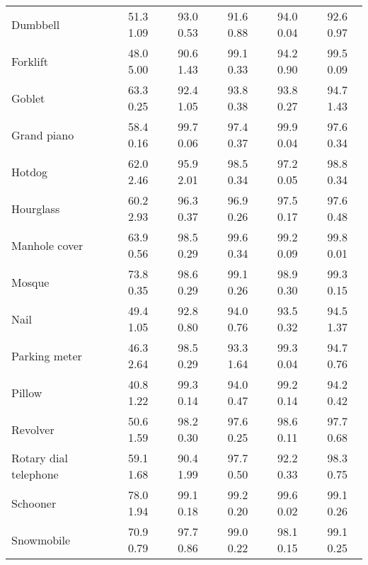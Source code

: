 \documentclass[10pt]{article} \usepackage[accepted]{stylefiles/tmlr}
\begin{document}
\begin{table*}[th]
\begin{tabular}{lccccc}
Dumbbell & \multicolumn{1}{c|}{51.3  1.09} & 93.0  0.53 & \multicolumn{1}{c|}{91.6  0.88} & 94.0  0.04 & \multicolumn{1}{c}{92.6  0.97} \\
Forklift & \multicolumn{1}{c|}{48.0  5.00} & 90.6  1.43 & \multicolumn{1}{c|}{99.1  0.33} & 94.2  0.90 & \multicolumn{1}{c}{99.5  0.09} \\
Goblet & \multicolumn{1}{c|}{63.3  0.25} & 92.4  1.05 & \multicolumn{1}{c|}{93.8  0.38} & 93.8  0.27 & \multicolumn{1}{c}{94.7  1.43} \\
Grand piano & \multicolumn{1}{c|}{58.4  0.16} & 99.7  0.06 & \multicolumn{1}{c|}{97.4  0.37} & 99.9  0.04 & \multicolumn{1}{c}{97.6  0.34} \\
Hotdog & \multicolumn{1}{c|}{62.0  2.46} & 95.9  2.01 & \multicolumn{1}{c|}{98.5  0.34} & 97.2  0.05 & \multicolumn{1}{c}{98.8  0.34} \\
Hourglass & \multicolumn{1}{c|}{60.2  2.93} & 96.3  0.37 & \multicolumn{1}{c|}{96.9  0.26} & 97.5  0.17 & \multicolumn{1}{c}{97.6  0.48} \\
Manhole cover & \multicolumn{1}{c|}{63.9  0.56} & 98.5  0.29 & \multicolumn{1}{c|}{99.6  0.34} & 99.2  0.09 & \multicolumn{1}{c}{99.8  0.01} \\
Mosque & \multicolumn{1}{c|}{73.8  0.35} & 98.6  0.29 & \multicolumn{1}{c|}{99.1  0.26} & 98.9  0.30 & \multicolumn{1}{c}{99.3  0.15} \\
Nail & \multicolumn{1}{c|}{49.4  1.05} & 92.8  0.80 & \multicolumn{1}{c|}{94.0  0.76} & 93.5  0.32 & \multicolumn{1}{c}{94.5  1.37} \\
Parking meter & \multicolumn{1}{c|}{46.3  2.64} & 98.5  0.29 & \multicolumn{1}{c|}{93.3  1.64} & 99.3  0.04 & \multicolumn{1}{c}{94.7  0.76} \\
Pillow & \multicolumn{1}{c|}{40.8  1.22} & 99.3  0.14 & \multicolumn{1}{c|}{94.0  0.47} & 99.2  0.14 & \multicolumn{1}{c}{94.2  0.42} \\
Revolver & \multicolumn{1}{c|}{50.6  1.59} & 98.2  0.30 & \multicolumn{1}{c|}{97.6  0.25} & 98.6  0.11 & \multicolumn{1}{c}{97.7  0.68} \\
Rotary dial telephone & \multicolumn{1}{c|}{59.1  1.68} & 90.4  1.99 & \multicolumn{1}{c|}{97.7  0.50} & 92.2  0.33 & \multicolumn{1}{c}{98.3  0.75} \\
Schooner & \multicolumn{1}{c|}{78.0  1.94} & 99.1  0.18 & \multicolumn{1}{c|}{99.2  0.20} & 99.6  0.02 & \multicolumn{1}{c}{99.1  0.26} \\
Snowmobile & \multicolumn{1}{c|}{70.9  0.79} & 97.7  0.86 & \multicolumn{1}{c|}{99.0  0.22} & 98.1  0.15 & \multicolumn{1}{c}{99.1  0.25} \\

\end{tabular}
\end{table*}
\end{document}
